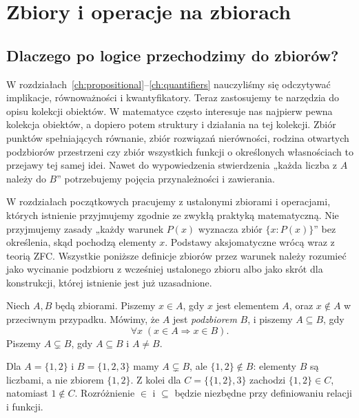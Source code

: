 \chapter{Zbiory i operacje na zbiorach}\label{ch:sets}

\section{Dlaczego po logice przechodzimy do zbiorów?}
W rozdziałach~\ref{ch:propositional}--\ref{ch:quantifiers}
nauczyliśmy się odczytywać implikacje, równoważności
i kwantyfikatory. Teraz zastosujemy te narzędzia do opisu
kolekcji obiektów. W matematyce często interesuje nas
najpierw pewna kolekcja obiektów,
a dopiero potem struktury i działania na tej kolekcji. Zbiór punktów
spełniających równanie, zbiór rozwiązań nierówności, rodzina otwartych
podzbiorów przestrzeni czy zbiór wszystkich funkcji o określonych
własnościach to przejawy tej samej idei. Nawet do wypowiedzenia
stwierdzenia „każda liczba z $A$ należy do $B$” potrzebujemy pojęcia
przynależności i zawierania.

\begin{uwaga}\label{rem:sets-metatheory}
W rozdziałach początkowych pracujemy z ustalonymi zbiorami i operacjami,
których istnienie przyjmujemy zgodnie ze zwykłą praktyką matematyczną.
Nie przyjmujemy zasady „każdy warunek $P(x)$ wyznacza zbiór
$\{x:P(x)\}$” bez określenia, skąd pochodzą elementy $x$. Podstawy
aksjomatyczne wrócą wraz z teorią ZFC. Wszystkie poniższe definicje
zbiorów przez warunek należy rozumieć jako wycinanie podzbioru z
wcześniej ustalonego zbioru albo jako skrót dla konstrukcji, której
istnienie jest już uzasadnione.
\end{uwaga}

\begin{definicja}\label{def:subset}
Niech $A,B$ będą zbiorami. Piszemy $x\in A$, gdy $x$ jest elementem
$A$, oraz $x\notin A$ w przeciwnym przypadku. Mówimy, że $A$ jest
\emph{podzbiorem} $B$, i piszemy $A\subseteq B$, gdy
\[
\forall x\;(x\in A\Longrightarrow x\in B).
\]
Piszemy $A\subsetneq B$, gdy $A\subseteq B$ i $A\ne B$.
\end{definicja}

\begin{przyklad}\label{ex:subset-basic}
Dla $A=\{1,2\}$ i $B=\{1,2,3\}$ mamy $A\subsetneq B$,
ale $\{1,2\}\notin B$: elementy $B$ są liczbami, a nie zbiorem $\{1,2\}$.
Z kolei dla $C=\{\{1,2\},3\}$ zachodzi $\{1,2\}\in C$,
natomiast $1\notin C$. Rozróżnienie $\in$ i $\subseteq$ będzie
niezbędne przy definiowaniu relacji i funkcji.
\end{przyklad}

